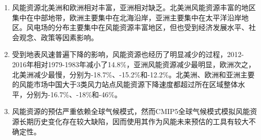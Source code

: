 \begin{enumerate}

\item 风能资源北美洲和欧洲相对丰富，亚洲相对缺乏。北美洲风能资源丰富的地区集中在中部地带，欧洲主要集中在北海沿岸，亚洲主要集中在太平洋沿岸地区。风电场的分布主要集中在风能资源丰富地区，但也受到经济发展水平、社会观念、政策等因素影响。

\item 受到地表风速普遍下降的影响，风能资源也经历了明显减少的过程，2012-2016年相对1979-1983年减小了14.8\%，亚洲风能资源减少最明显，欧洲次之，北美洲减少最慢，分别为-18.7\%、-15.2\%和-12.2\%。北美洲、欧洲和亚洲主要的风能市场中国大于3类风力站点风能资源下降速度都超过所在区域整体水平，分别为-16.7\%、-18\%和-46\%。

\item 风能资源的预估严重依赖全球气候模式，然而CMIP5全球气候模式模拟风能资源长期历史变化存在较大缺陷，因而使用其作为风能未来预估的工具有较大不确定性。

\end{enumerate}

